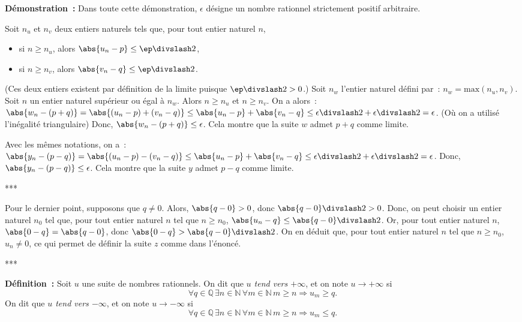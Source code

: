 \medskip

\noindent\textbf{Démonstration :}
    Dans toute cette démonstration, $\epsilon$ désigne un nombre rationnel strictement positif arbitraire.

    Soit $n_u$ et $n_v$ deux entiers naturels tels que, pour tout entier naturel $n$, 
    \begin{itemize}[nosep]
        \item si $n \geq n_u$, alors $\abs{u_n - p} \leq \ep \divslash 2$, 
        \item si $n \geq n_v$, alors $\abs{v_n - q} \leq \ep \divslash 2$. 
    \end{itemize}
    (Ces deux entiers existent par définition de la limite puisque $\ep \divslash 2 > 0$.)
    Soit $n_w$ l'entier naturel défini par : $n_w = \mathrm{max}(n_u, n_v)$. 
    Soit $n$ un entier naturel supérieur ou égal à $n_w$. 
    Alors $n \geq n_u$ et $n \geq n_v$. 
    On a alors : $\abs{w_n - (p+q)} = \abs{(u_n-p) + (v_n-q)} \leq \abs{u_n-p} + \abs{v_n-q} \leq \epsilon \divslash 2 + \epsilon \divslash 2 = \epsilon$.
    (Où on a utilisé l'inégalité triangulaire)
    Donc, $\abs{w_n - (p+q)} \leq \epsilon$.
    Cela montre que la suite $w$ admet $p+q$ comme limite.

    Avec les mêmes notations, on a : $\abs{y_n - (p-q)} = \abs{(u_n-p) - (v_n-q)} \leq \abs{u_n-p} + \abs{v_n-q} \leq \epsilon \divslash 2 + \epsilon \divslash 2 = \epsilon$.
    Donc, $\abs{y_n - (p-q)} \leq \epsilon$.
    Cela montre que la suite $y$ admet $p-q$ comme limite.

    ***

    Pour le dernier point, supposons que $q \neq 0$. 
    Alors, $\abs{q - 0} > 0$, donc $\abs{q - 0} \divslash 2 > 0$. 
    Donc, on peut choisir un entier naturel $n_0$ tel que, pour tout entier naturel $n$ tel que $n \geq n_0$, $\abs{u_n - q} \leq \abs{q - 0} \divslash 2$.
    Or, pour tout entier naturel $n$, $\abs{0 - q} = \abs{q - 0}$, donc $\abs{0 - q} > \abs{q - 0} \divslash 2$. 
    On en déduit que, pour tout entier naturel $n$ tel que $n \geq n_0$, $u_n \neq 0$, ce qui permet de définir la suite $z$ comme dans l'énoncé.
    
    ***

\medskip

\noindent\textbf{Définition :} Soit $u$ une suite de nombres rationnels. 
    On dit que \emph{$u$ tend vers $+\infty$}, et on note $u \rightarrow + \infty$ si
    \begin{equation*}
        \forall q \in \mathbb{Q} \, 
        \exists n \in \mathbb{N} \, 
        \forall m \in \mathbb{N} \, 
        m \geq n \Rightarrow
            u_m \geq q.
    \end{equation*}
    On dit que \emph{$u$ tend vers $-\infty$}, et on note $u \rightarrow - \infty$ si
    \begin{equation*}
        \forall q \in \mathbb{Q} \, 
        \exists n \in \mathbb{N} \, 
        \forall m \in \mathbb{N} \, 
        m \geq n \Rightarrow
            u_m \leq q.
    \end{equation*}

